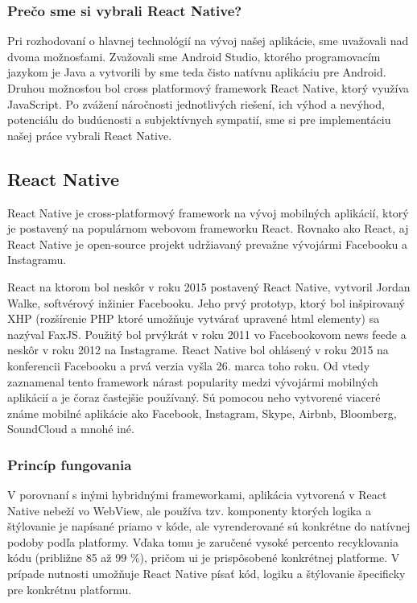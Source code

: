 \subsubsection{Prečo sme si vybrali React Native?}
Pri rozhodovaní o hlavnej technológií na vývoj našej aplikácie, sme uvažovali nad dvoma možnosťami. Zvažovali sme Android Studio, ktorého programovacím jazykom je Java a vytvorili by sme teda čisto natívnu aplikáciu pre Android. Druhou možnosťou bol cross platformový framework React Native, ktorý využíva JavaScript. Po zvážení náročnosti jednotlivých riešení, ich výhod a nevýhod, potenciálu do budúcnosti a subjektívnych sympatií, sme si pre implementáciu našej práce vybrali React Native. \\

\subsection{React Native}
\label{sec:React Native}

React Native je cross-platformový framework na vývoj mobilných aplikácií, ktorý je postavený na populárnom webovom frameworku React. Rovnako ako React, aj React Native je open-source projekt udržiavaný prevažne vývojármi Facebooku a Instagramu.

React na ktorom bol neskôr v roku 2015 postavený React Native, vytvoril Jordan Walke, softvérový inžinier Facebooku. Jeho prvý prototyp, ktorý bol inšpirovaný XHP (rozšírenie PHP ktoré umožňuje vytvárať upravené \acrshort{html} elementy) sa nazýval FaxJS. Použitý bol prvýkrát v roku 2011 vo Facebookovom news feede a neskôr v roku 2012 na Instagrame. \cite{rn2} React Native bol ohlásený v roku 2015 na konferencii Facebooku a prvá verzia vyšla 26. marca toho roku. Od vtedy zaznamenal tento framework nárast popularity medzi vývojármi mobilných aplikácií a je čoraz častejšie používaný. Sú pomocou neho vytvorené viaceré známe mobilné aplikácie ako Facebook, Instagram, Skype, Airbnb, Bloomberg, SoundCloud a mnohé iné. \\
\subsubsection{Princíp fungovania}
V porovnaní s inými hybridnými frameworkami, aplikácia vytvorená v React Native nebeží vo WebView, ale používa tzv. komponenty ktorých logika a štýlovanie je napísané priamo v kóde, ale vyrenderované sú konkrétne do natívnej podoby podľa platformy. Vďaka tomu je zaručené vysoké percento recyklovania kódu (približne 85 až 99 \%), pričom \acrshort{ui} je prispôsobené konkrétnej platforme. V prípade nutnosti umožňuje React Native písať kód, logiku a štýlovanie špecificky pre konkrétnu platformu. \\
